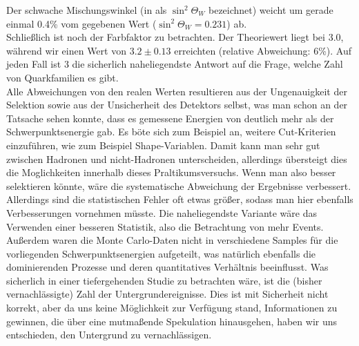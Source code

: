Der schwache Mischungswinkel (in \cite{pdb} als $\sin^2\Theta_W$ bezeichnet) weicht um gerade einmal 0.4\si{\percent} vom gegebenen Wert ($\sin^2\Theta_W = 0.231$) ab.\\
Schließlich ist noch der Farbfaktor zu betrachten. Der Theoriewert liegt bei 3.0, während wir einen Wert von $3.2\pm 0.13$ erreichten (relative Abweichung: 6\si{\percent}). Auf jeden Fall ist 3 die sicherlich naheliegendste Antwort auf die Frage, welche Zahl von Quarkfamilien es gibt.\\
Alle Abweichungen von den realen Werten resultieren aus der Ungenauigkeit der Selektion sowie aus der Unsicherheit des Detektors selbst, was man schon an der Tatsache sehen konnte, dass es gemessene Energien von deutlich mehr als der Schwerpunktsenergie gab. Es böte sich zum Beispiel an, weitere Cut-Kriterien einzuführen, wie zum Beispiel Shape-Variablen. Damit kann man sehr gut zwischen Hadronen und nicht-Hadronen unterscheiden, allerdings übersteigt dies die Moglichkeiten innerhalb dieses Praltikumsversuchs. Wenn man also besser selektieren könnte, wäre die systematische Abweichung der Ergebnisse verbessert. Allerdings sind die statistischen Fehler oft etwas größer, sodass man hier ebenfalls Verbesserungen vornehmen müsste. Die naheliegendste Variante wäre das Verwenden einer besseren Statistik, also die Betrachtung von mehr Events. Außerdem waren die Monte Carlo-Daten nicht in verschiedene Samples für die vorliegenden Schwerpunktsenergien aufgeteilt, was natürlich ebenfalls die dominierenden Prozesse und deren quantitatives Verhältnis beeinflusst. Was sicherlich in einer tiefergehenden Studie zu betrachten wäre, ist die (bisher vernachlässigte) Zahl der Untergrundereignisse. Dies ist mit Sicherheit nicht korrekt, aber da uns keine Möglichkeit zur Verfügung stand, Informationen zu gewinnen, die über eine mutmaßende Spekulation hinausgehen, haben wir uns entschieden, den Untergrund zu vernachlässigen.